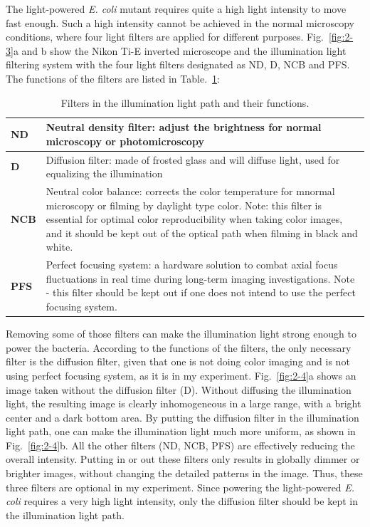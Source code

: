 The light-powered \textit{E. coli} mutant requires quite a high light intensity to move fast enough. Such a high intensity cannot be achieved in the normal microscopy conditions, where four light filters are applied for different purposes. Fig.~\ref{fig:2-3}a and b show the Nikon Ti-E inverted microscope and the illumination light filtering system with the four light filters designated as ND, D, NCB and PFS. The functions of the filters are listed in Table.~\ref{table:2-1}:

\begin{table}[h]
	\centering
	\begin{tabular}{ | p{0.4in} | p{5in} |}
		\hline
		\textbf{ND} & Neutral density filter: adjust the brightness for normal microscopy or photomicroscopy \\
		\hline
		\textbf{D} & Diffusion filter: made of frosted glass and will diffuse light, used for equalizing the illumination \\
		\hline
		\textbf{NCB} & Neutral color balance: corrects the color temperature for mnormal microscopy or filming by daylight type color. Note: this filter is essential for optimal color reproducibility when taking color images, and it should be kept out of the optical path when filming in black and white. \\
		\hline
		\textbf{PFS} & Perfect focusing system: a hardware solution to combat axial focus fluctuations in real time during long-term imaging investigations. Note - this filter should be kept out if one does not intend to use the perfect focusing system.\\
		\hline
	\end{tabular}
	\caption[Filters in the illumination light path and their functions.]{Filters in the illumination light path and their functions.}
	\label{table:2-1}
\end{table}

Removing some of those filters can make the illumination light strong enough to power the bacteria. According to the functions of the filters, the only necessary filter is the diffusion filter, given that one is not doing color imaging and is not using perfect focusing system, as it is in my experiment. Fig.~\ref{fig:2-4}a shows an image taken without the diffusion filter (D). Without diffusing the illumination light, the resulting image is clearly inhomogeneous in a large range, with a bright center and a dark bottom area. By putting the diffusion filter in the illumination light path, one can make the illumination light much more uniform, as shown in Fig.~\ref{fig:2-4}b. All the other filters (ND, NCB, PFS) are effectively reducing the overall intensity. Putting in or out these filters only results in globally dimmer or brighter images, without changing the detailed patterns in the image. Thus, these three filters are optional in my experiment. Since powering the light-powered \textit{E. coli} requires a very high light intensity, only the diffusion filter should be kept in the illumination light path.

